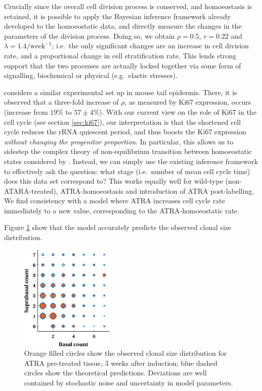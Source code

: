\documentclass[10pt,english]{report}
\begin{document}
Crucially since the overall cell division process is conserved, and homoeostasis is retained, it is possible to apply the Bayesian inference framework already developed to the homoeostatic data, and directly measure the changes in the parameters of the division process. Doing so, we obtain $\rho = 0.5$, $r = 0.22$ and $\lambda = 1.4/\textrm{week}^{-1}$; i.e.\ the only significant changes are an increase in cell division rate, and a proportional change in cell stratification rate. This lends strong support that the two processes are actually locked together via some form of signalling, biochemical or physical (e.g.\ elastic stresses).

\citet[][chapter 4]{kleinthesis} considers a similar experimental set up in mouse tail epidermis. There, it is observed that a three-fold increase of $\rho$, as measured by Ki67 expression, occurs (increase from $19\%$ to $57\pm4\%$). With our current view on the role of Ki67 in the cell cycle (see section \ref{sec:ki67}), our interpretation is that the shortened cell cycle reduces the rRNA quiescent period, and thus boosts the Ki67 expression \emph{without changing the progenitor proportion}. In particular, this allows us to sidestep the complex theory of non-equilibrium transition between homoeostatic states considered by \citet{kleinthesis}. Instead, we can simply use the existing inference framework to effectively ask the question: what stage (i.e.\ number of mean cell cycle time) does this data set correspond to? This works equally well for wild-type (non-ATARA-treated), ATRA-homoeostasis and introduction of ATRA post-labelling. We find consistency with a model where ATRA increases cell cycle rate immediately to a new value, corresponding to the ATRA-homoeostatic rate.

Figure \ref{fig:oes-atra} show that the model accurately predicts the observed clonal size distribution.

\begin{figure}[htb]
	\centering
	\includegraphics[height=2in]{oes-atra-bubbles.png}
	\caption{\label{fig:oes-atra}Orange filled circles show the observed clonal size distribution for ATRA pre-treated tissue, $3$ weeks after induction; blue dashed circles show the theoretical predictions. Deviations are well contained by stochastic noise and uncertainty in model parameters.}
\end{figure}
\end{document}
